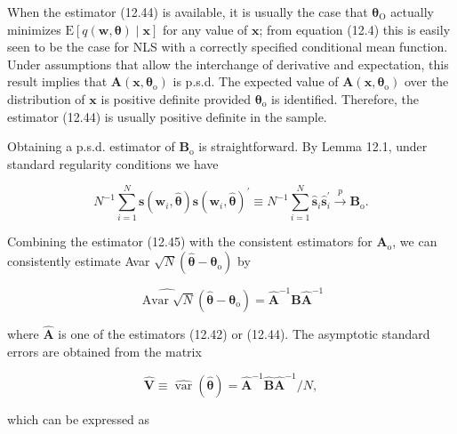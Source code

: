 \documentclass[10pt]{article}
\begin{document}
When the estimator (12.44) is available, it is usually the case that $\boldsymbol{\theta}_{\mathrm{O}}$ actually minimizes $\mathrm{E}[q(\mathbf{w}, \boldsymbol{\theta}) \mid \mathbf{x}]$ for any value of $\mathbf{x}$; from equation (12.4) this is easily seen to be the case for NLS with a correctly specified conditional mean function. Under assumptions that allow the interchange of derivative and expectation, this result implies that $\mathbf{A}\left(\mathbf{x}, \boldsymbol{\theta}_{\mathrm{o}}\right)$ is p.s.d. The expected value of $\mathbf{A}\left(\mathbf{x}, \boldsymbol{\theta}_{\mathrm{o}}\right)$ over the distribution of $\mathbf{x}$ is positive definite provided $\boldsymbol{\theta}_{\mathrm{o}}$ is identified. Therefore, the estimator (12.44) is usually positive definite in the sample.

Obtaining a p.s.d. estimator of $\mathbf{B}_{\mathrm{o}}$ is straightforward. By Lemma 12.1, under standard regularity conditions we have


\begin{equation*}
N^{-1} \sum_{i=1}^{N} \mathbf{s}\left(\mathbf{w}_{i}, \hat{\boldsymbol{\theta}}\right) \mathbf{s}\left(\mathbf{w}_{i}, \hat{\boldsymbol{\theta}}\right)^{\prime} \equiv N^{-1} \sum_{i=1}^{N} \hat{\mathbf{s}}_{i} \hat{\mathbf{s}}_{i}^{\prime} \xrightarrow{p} \mathbf{B}_{\mathrm{o}} . \tag{12.45}
\end{equation*}


Combining the estimator (12.45) with the consistent estimators for $\mathbf{A}_{\mathrm{o}}$, we can consistently estimate Avar $\sqrt{N}\left(\hat{\boldsymbol{\theta}}-\boldsymbol{\theta}_{\mathrm{o}}\right)$ by


\begin{equation*}
\widehat{\operatorname{Avar} \sqrt{N}}\left(\hat{\boldsymbol{\theta}}-\boldsymbol{\theta}_{\mathrm{o}}\right)=\hat{\mathbf{A}}^{-1} \hat{\mathbf{B}} \hat{\mathbf{A}}^{-1} \tag{12.46}
\end{equation*}


where $\hat{\mathbf{A}}$ is one of the estimators (12.42) or (12.44). The asymptotic standard errors are obtained from the matrix


\begin{equation*}
\hat{\mathbf{V}} \equiv \widehat{\operatorname{var}}(\hat{\boldsymbol{\theta}})=\hat{\mathbf{A}}^{-1} \hat{\mathbf{B}} \hat{\mathbf{A}}^{-1} / N, \tag{12.47}
\end{equation*}


which can be expressed as
\end{document}
